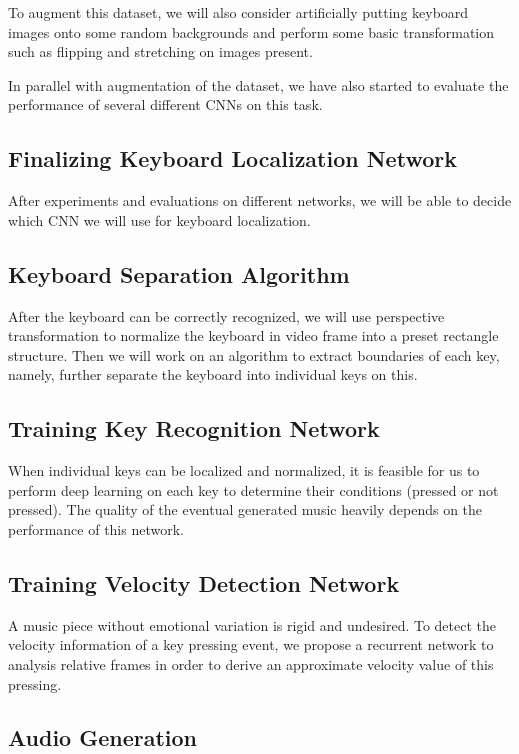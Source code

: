 \documentclass[10pt,twocolumn,letterpaper]{article}
\begin{document}
To augment this dataset, we will also consider artificially putting keyboard images onto some random backgrounds and perform some basic transformation such as flipping and stretching on images present.

In parallel with augmentation of the dataset, we have also started to evaluate the performance of several different CNNs on this task.

\subsection{Finalizing Keyboard Localization Network}

After experiments and evaluations on different networks, we will be able to decide which CNN we will use for keyboard localization.

\subsection{Keyboard Separation Algorithm}

After the keyboard can be correctly recognized, we will use perspective transformation to normalize the keyboard in video frame into a preset rectangle structure. Then we will work on an algorithm to extract boundaries of each key, namely, further separate the keyboard into individual keys on this.

\subsection{Training Key Recognition Network}

When individual keys can be localized and normalized, it is feasible for us to perform deep learning on each key to determine their conditions (pressed or not pressed). The quality of the eventual generated music heavily depends on the performance of this network.

\subsection{Training Velocity Detection Network}

A music piece without emotional variation is rigid and undesired. To detect the velocity information of a key pressing event, we propose a recurrent network to analysis relative frames in order to derive an approximate velocity value of this pressing.

\subsection{Audio Generation}
\end{document}
